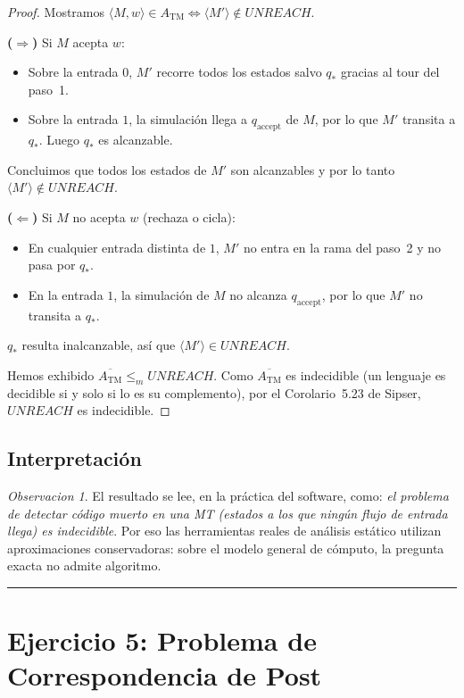 \documentclass[11pt,a4paper]{article}
\theoremstyle{plain}
\theoremstyle{definition}
\theoremstyle{remark}
\newtheorem*{observacion}{Observacion}
\newcommand{\TM}{\mathrm{TM}}
\newcommand{\enc}[1]{\langle #1\rangle}
\newcommand{\encMw}{\langle M, w\rangle}
\newcommand{\redm}{\le_{m}}
\newcommand{\compl}[1]{\overline{#1}}
\newcommand{\qaccept}{q_{\text{accept}}}
\newcommand{\ATM}{A_{\TM}}
\begin{document}
\begin{proof}
Mostramos $\encMw \in \ATM \iff \enc{M'} \notin UNREACH$.

\textbf{($\Rightarrow$)} Si $M$ acepta $w$:
\begin{itemize}
  \item Sobre la entrada $0$, $M'$ recorre todos los estados salvo $q_*$
        gracias al tour del paso~1.
  \item Sobre la entrada $1$, la simulaci\'on llega a $\qaccept$ de $M$,
        por lo que $M'$ transita a $q_*$. Luego $q_*$ es alcanzable.
\end{itemize}
Concluimos que todos los estados de $M'$ son alcanzables y por lo tanto
$\enc{M'}\notin UNREACH$.

\textbf{($\Leftarrow$)} Si $M$ no acepta $w$ (rechaza o cicla):
\begin{itemize}
  \item En cualquier entrada distinta de $1$, $M'$ no entra en la rama
        del paso~2 y no pasa por $q_*$.
  \item En la entrada $1$, la simulaci\'on de $M$ no alcanza $\qaccept$,
        por lo que $M'$ no transita a $q_*$.
\end{itemize}
$q_*$ resulta inalcanzable, as\'i que $\enc{M'}\in UNREACH$.

Hemos exhibido $\compl{\ATM} \redm UNREACH$. Como $\compl{\ATM}$ es
indecidible (un lenguaje es decidible si y solo si lo es su complemento),
por el Corolario~5.23 de Sipser, $UNREACH$ es indecidible.
\end{proof}

\subsection*{Interpretaci\'on}

\begin{observacion}
El resultado se lee, en la pr\'actica del software, como: \emph{el problema
de detectar c\'odigo muerto en una MT (estados a los que ning\'un flujo
de entrada llega) es indecidible}. Por eso las herramientas reales de
an\'alisis est\'atico utilizan aproximaciones conservadoras: sobre el modelo
general de c\'omputo, la pregunta exacta no admite algoritmo.
\end{observacion}

\bigskip\hrule\bigskip

\section{Ejercicio 5: Problema de Correspondencia de Post}
\label{sec:ej5}
\end{document}
